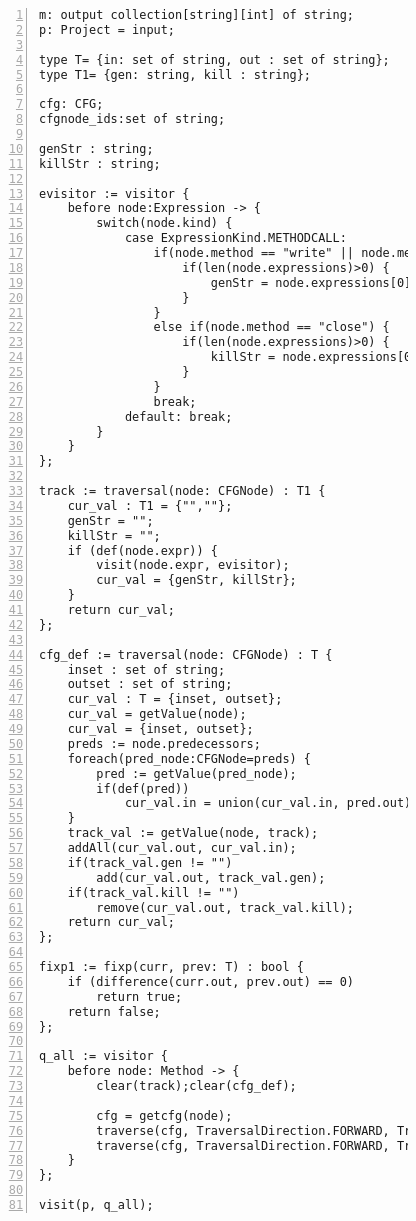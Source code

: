 \begin{figure}[ht!]
\begin{lstlisting}[numbers=left, tabsize=4, escapechar=@, caption={Resource status},label={lst:rs-code}, lastline = 54] 
m: output collection[string][int] of string;
p: Project = input;

type T= {in: set of string, out : set of string};
type T1= {gen: string, kill : string};

cfg: CFG;
cfgnode_ids:set of string;

genStr : string;
killStr : string; 

evisitor := visitor {
	before node:Expression -> {
		switch(node.kind) {
			case ExpressionKind.METHODCALL: 
				if(node.method == "write" || node.method == "read" || node.method == "open") {
					if(len(node.expressions)>0) {
						genStr = node.expressions[0].variable;
					}
				}
				else if(node.method == "close") {
					if(len(node.expressions)>0) {
						killStr = node.expressions[0].variable;
					}
				}
  				break;
			default: break;
		}
	}
};

track := traversal(node: CFGNode) : T1 {
	cur_val : T1 = {"",""};
	genStr = "";
	killStr = "";
	if (def(node.expr)) {
		visit(node.expr, evisitor);
		cur_val = {genStr, killStr};
	}
	return cur_val;
};

cfg_def := traversal(node: CFGNode) : T {
	inset : set of string;
	outset : set of string;
	cur_val : T = {inset, outset};
	cur_val = getValue(node);
	cur_val = {inset, outset};
	preds := node.predecessors;
	foreach(pred_node:CFGNode=preds) {
		pred := getValue(pred_node);
		if(def(pred))
			cur_val.in = union(cur_val.in, pred.out);
	}
	track_val := getValue(node, track);
	addAll(cur_val.out, cur_val.in);
	if(track_val.gen != "")
		add(cur_val.out, track_val.gen);
	if(track_val.kill != "")
		remove(cur_val.out, track_val.kill);
	return cur_val;
};

fixp1 := fixp(curr, prev: T) : bool {
	if (difference(curr.out, prev.out) == 0)
		return true;	
	return false;
};

q_all := visitor {
	before node: Method -> {
		clear(track);clear(cfg_def);

		cfg = getcfg(node);
		traverse(cfg, TraversalDirection.FORWARD, TraversalKind.HYBRID, track);
		traverse(cfg, TraversalDirection.FORWARD, TraversalKind.HYBRID, cfg_def, fixp1);
	}
};

visit(p, q_all);
\end{lstlisting}
\end{figure}